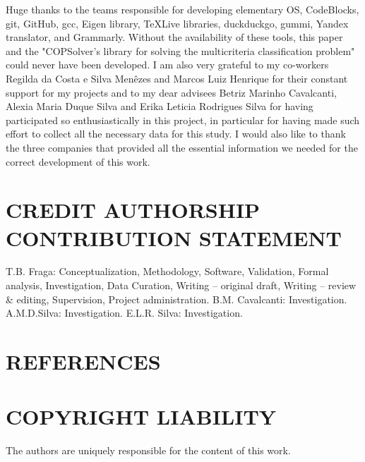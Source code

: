 \documentclass[10pt,fleqn,a4paper,twoside]{article}
\begin{document}
Huge thanks to the teams responsible for developing elementary OS, CodeBlocks, git, GitHub, gcc, Eigen library, TeXLive libraries, duckduckgo, gummi, Yandex translator, and Grammarly. Without the availability of these tools, this paper and the "COPSolver's library for solving the multicriteria classification problem" could never have been developed. I am also very grateful to my co-workers Regilda da Costa e Silva Menêzes and Marcos Luiz Henrique for their constant support for my projects and to my dear advisees Betriz Marinho Cavalcanti, Alexia Maria Duque Silva and Erika Leticia Rodrigues Silva for having participated so enthusiastically in this project, in particular for having made such effort to collect all the necessary data for this study. I would also like to thank the three companies that provided all the essential information we needed for the correct development of this work.
        
        \section{CREDIT AUTHORSHIP CONTRIBUTION STATEMENT} 
		\label{sec:contributions}

		T.B. Fraga: Conceptualization, Methodology, Software, Validation, Formal analysis, Investigation, Data Curation, Writing – original draft, Writing – review \& editing, Supervision, Project administration. B.M. Cavalcanti: Investigation. A.M.D.Silva: Investigation. E.L.R. Silva: Investigation. 
        
    \section{REFERENCES}
    
        
        
        
        
 \section{COPYRIGHT LIABILITY}
    
        The authors are uniquely responsible for the content of this work.
\end{document}
